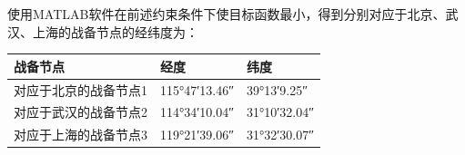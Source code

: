 \documentclass{article}
\begin{document}
使用MATLAB软件在前述约束条件下使目标函数最小，得到分别对应于北京、武汉、上海的战备节点的经纬度为：

\begin{table}[htpb]
	\centering
	\caption{对应于北京、武汉、上海的战备节点的经纬度}
	\label{AB}
	\begin{longtabu}to
		\toprule
		战备节点 & 经度 & 纬度\\
		\midrule
		对应于北京的战备节点1 & \ang{115;47;13.46}&\ang{39;13;9.25}\\
		对应于武汉的战备节点2 & \ang{114;34;10.04}&\ang{31;10;32.04}\\
		对应于上海的战备节点3 & \ang{119;21;39.06}&\ang{31;32;30.07}\\
		\bottomrule
	\end{longtabu}
\end{table}
\end{document}
